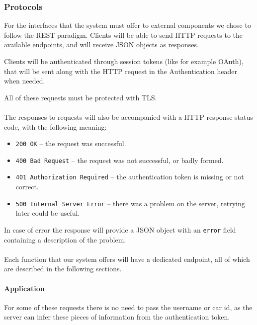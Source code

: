 \documentclass[english]{article}
\newcommand{\code}[1]{\texttt{#1}}
\begin{document}
\subsubsection{Protocols}

For the interfaces that the system must offer to external components we chose to follow the REST paradigm.
Clients will be able to send HTTP requests to the available endpoints, and will receive JSON objects as responses.

Clients will be authenticated through session tokens (like for example OAuth), that will be sent along with the HTTP request in the Authentication header when needed.

All of these requests must be protected with TLS.

\paragraph{}
The responses to requests will also be accompanied with a HTTP response status code, with the following meaning:
\begin{itemize}
	\item{\code{200 OK} -- the request was successful.}
	\item{\code{400 Bad Request} -- the request was not successful, or badly formed.}
	\item{\code{401 Authorization Required} -- the authentication token is missing or not correct.}
	\item{\code{500 Internal Server Error} -- there was a problem on the server, retrying later could be useful.}
\end{itemize}

In case of error the response will provide a JSON object with an \code{error} field containing a description of the problem.

\paragraph{}
Each function that our system offers will have a dedicated endpoint, all of which are described in the following sections.

\paragraph{Application}
For some of these requests there is no need to pass the username or car id, as the server can infer these pieces of information from the authentication token.
\end{document}

